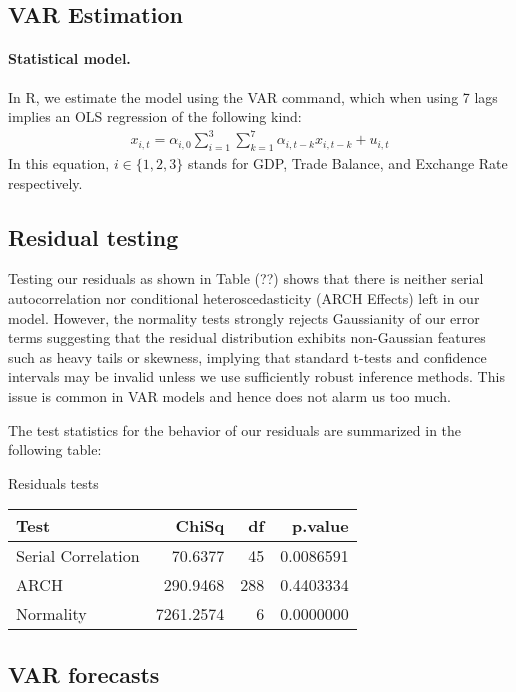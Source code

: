 \documentclass[
]{article}
\begin{document}
\subsection{VAR Estimation}

\paragraph*{Statistical model.}

In R, we estimate the model using the VAR command, which when using 7 lags implies an OLS regression of the following kind: 
\begin{align*}
x_{i,t}=\alpha_{i,0} \sum_{i=1}^3\sum_{k=1}^7\alpha_{i,t-k}x_{i,t-k} + u_{i,t}
\end{align*}
In this equation, $i\in\{1,2,3\}$ stands for GDP, Trade Balance, and Exchange Rate respectively. 

\subsection{Residual testing}

Testing our residuals as shown in Table (??) shows that there is neither serial 
autocorrelation nor conditional heteroscedasticity (ARCH Effects) left in our model. 
However, the normality tests strongly rejects Gaussianity of our error terms suggesting 
that the residual distribution exhibits non-Gaussian features such as heavy tails or 
skewness, implying that standard t-tests and confidence intervals may be invalid 
unless we use sufficiently robust inference methods. This issue is common in VAR models and hence does not alarm us too much.


The test statistics for the behavior of our residuals are summarized in
the following table:

\bgroup \table[H]
\centering
\caption{\label{tab:unnamed-chunk-22}Residuals tests}
\centering
\begin{tabular}[t]{lrrr}
\toprule
Test & ChiSq & df & p.value\\
\midrule
Serial Correlation & 70.6377 & 45 & 0.0086591\\
ARCH & 290.9468 & 288 & 0.4403334\\
Normality & 7261.2574 & 6 & 0.0000000\\
\bottomrule
\end{tabular}
\endtable\egroup

\subsection{VAR forecasts}
\end{document}
